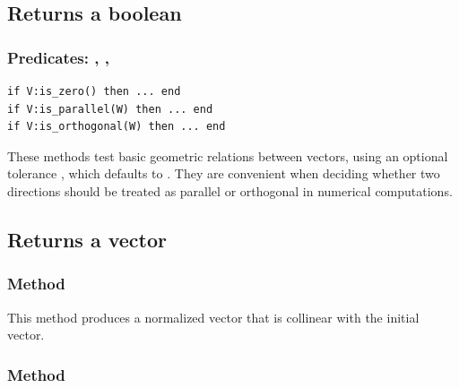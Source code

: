 \subsection{Returns a boolean}

\subsubsection{Predicates: , , }

\begin{verbatim}
if V:is_zero() then ... end
if V:is_parallel(W) then ... end
if V:is_orthogonal(W) then ... end
\end{verbatim}

These methods test basic geometric relations between vectors, using an optional
tolerance , which defaults to . They are convenient
when deciding whether two directions should be treated as parallel or orthogonal
in numerical computations.

\subsection{Returns a vector}


\subsubsection{Method }
\label{ssub:method_vector_normalize}
This method produces a normalized vector that is collinear with the initial vector.

 \begin{tkzexample}[latex = .5\textwidth]
 \end{tkzexample}

\subsubsection{Method }
\label{ssub:method_vector_at}

 \begin{tkzexample}[latex = .5\textwidth]
 \end{tkzexample}

